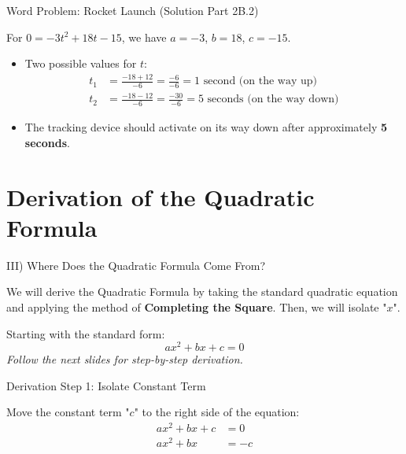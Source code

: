 \documentclass[aspectratio=169]{beamer}
\begin{document}
\begin{frame}{Word Problem: Rocket Launch (Solution Part 2B.2)}
    \begin{tcolorbox}[colback=lightgray,colframe=accent,title=Solution Part 2B.2: Final Conclusion]
        \footnotesize
        For $0 = -3t^2 + 18t - 15$, we have $a=-3$, $b=18$, $c=-15$.
        \begin{itemize}
            \item Two possible values for $t$:
                \begin{align*}
                    t_1 &= \frac{-18 + 12}{-6} = \frac{-6}{-6} = 1 \text{ second (on the way up)} \\
                    t_2 &= \frac{-18 - 12}{-6} = \frac{-30}{-6} = 5 \text{ seconds (on the way down)}
                \end{align*}
            \item The tracking device should activate on its way down after approximately \textbf{5 seconds}.
        \end{itemize}
    \end{tcolorbox}
\end{frame}

\section{Derivation of the Quadratic Formula}

\begin{frame}{III) Where Does the Quadratic Formula Come From?}
    \begin{tcolorbox}[colback=lightgray,colframe=primary,title=Derivation using Completing the Square]
        \footnotesize
        We will derive the Quadratic Formula by taking the standard quadratic equation and applying the method of \textbf{Completing the Square}. Then, we will isolate "$x$".

        Starting with the standard form:
        \[ ax^2 + bx + c = 0 \]
        \textit{Follow the next slides for step-by-step derivation.}
    \end{tcolorbox}
\end{frame}

\begin{frame}{Derivation Step 1: Isolate Constant Term}
    \begin{tcolorbox}[colback=lightgray,colframe=accent,title=Step 1]
        \footnotesize
        Move the constant term "$c$" to the right side of the equation:
        \begin{align*}
            ax^2 + bx + c &= 0 \\
            ax^2 + bx &= -c
        \end{align*}
    \end{tcolorbox}
\end{frame}
\end{document}
